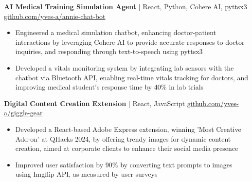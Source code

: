 \textbf{AI Medical Training Simulation Agent} | React, Python, Cohere AI, pyttsx3  \hfill \href{https://github.com/yves-a/annie-chat-bot}{github.com/yves-a/annie-chat-bot} \\
\vspace{-5pt}
\begin{itemize}
  \item Engineered a medical simulation chatbot, enhancing doctor-patient interactions by leveraging Cohere AI to provide accurate responses to doctor inquiries, and responding through text-to-speech using pyttsx3
  \item Developed a vitals monitoring system by integrating lab sensors with the chatbot via Bluetooth API, enabling real-time vitals tracking for doctors, and improving medical student's response time by 40\% in lab trials
\end{itemize}
\textbf{Digital Content Creation Extension} | React, JavaScript \hfill \href{https://github.com/yves-a/giggle-gear}{github.com/yves-a/giggle-gear} \\
\vspace{-5pt}
\begin{itemize}
  \item Developed a React-based Adobe Express extension, winning 'Most Creative Add-on' at QHacks 2024, by offering trendy images for dynamic content creation, aimed at corporate clients to enhance their social media presence
  \item Improved user satisfaction by 90\% by converting text prompts to images using Imgflip API, as measured by user surveys
\end{itemize}

